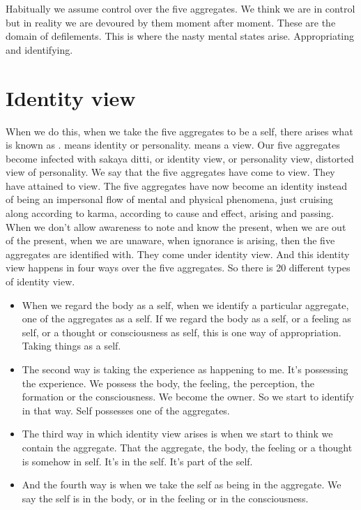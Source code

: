 \documentclass[letterpaper,10pt,english]{sphinxmanual}
\begin{document}
\sphinxAtStartPar
Habitually  we  assume  control  over  the  five  aggregates. We  think  we
are in control but in reality we are devoured by them moment after moment.
These are the domain of defilements. This is where the nasty mental states
arise. Appropriating and identifying.


\section{Identity view}
\label{\detokenize{5-b:identity-view}}
\sphinxAtStartPar
When we do this, when we take the five aggregates to be a self, there
arises what is known as
.
means identity or personality.
means a view. Our five aggregates become infected with sakaya ditti, or
identity view, or personality view, distorted view of personality. We say that
the five aggregates have come to view. They have attained to view. The five
aggregates have now become an identity instead of being an impersonal flow
of mental and physical phenomena, just cruising along according to karma,
according  to  cause  and  effect,  arising  and  passing.  When  we  don’t  allow
awareness  to  note  and  know  the  present,  when  we  are  out  of  the  present,
when we are unaware, when ignorance is arising, then the five aggregates
are identified with. They come under identity view. And this identity view
happens in four ways over the five aggregates. So there is 20 different types
of identity view.
\begin{itemize}
\item {} 
\sphinxAtStartPar
When we regard the body as a self, when we identify a particular aggregate,
 one of the aggregates as a self. If we regard the body as a self,
or a feeling as self, or a thought or consciousness as self, this is one
way of appropriation. Taking things as a self.

\item {} 
\sphinxAtStartPar
The second way is taking the experience as happening to me. It’s possessing the experience. We possess the body, the feeling, the perception, the formation or the consciousness. We become the owner. So we
start to identify in that way. Self possesses one of the aggregates.

\item {} 
\sphinxAtStartPar
The third way in which identity view arises is when we start to think
we contain the aggregate. That the aggregate, the body, the feeling or a
thought is somehow in self. It’s in the self. It’s part of the self.

\item {} 
\sphinxAtStartPar
And the fourth way is when we take the self as being in the aggregate.
We say the self is in the body, or in the feeling or in the consciousness.

\end{itemize}
\end{document}
